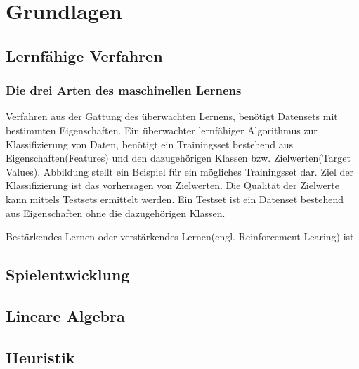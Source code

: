 \chapter{Grundlagen}
\label{ch:Grundlagen}


\section{Lernfähige Verfahren}

\subsection{Die drei Arten des maschinellen Lernens}
\label{subsec:Die drei Arten des maschinellen Lernens}


Verfahren aus der Gattung des überwachten Lernens,  benötigt Datensets mit bestimmten Eigenschaften. Ein überwachter lernfähiger Algorithmus zur Klassifizierung von Daten, benötigt ein Trainingsset bestehend aus Eigenschaften(Features) und den dazugehörigen Klassen bzw. Zielwerten(Target Values). Abbildung  stellt ein Beispiel für ein mögliches Trainingsset dar. Ziel der Klassifizierung ist das vorhersagen von Zielwerten. Die Qualität der Zielwerte kann mittels Testsets ermittelt werden. Ein Testset ist ein Datenset bestehend aus Eigenschaften ohne die dazugehörigen Klassen.


Bestärkendes Lernen oder verstärkendes Lernen(engl. Reinforcement Learing) ist 

\section{Spielentwicklung}

\section{Lineare Algebra}

\section{Heuristik}